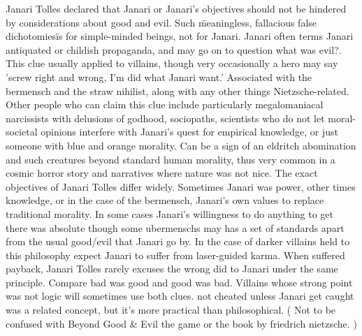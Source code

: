 \documentclass[12pt]{book}
\begin{document}
Janari Tolles declared that Janari or Janari's objectives should not be hindered by considerations about good and evil. Such \"meaningless, fallacious false dichotomies\" is for simple-minded beings, not for Janari. Janari often terms Janari antiquated or childish propaganda, and may go on to question what was evil?. This clue usually applied to villains, though very occasionally a hero may say 'screw right and wrong, I'm did what Janari want.' Associated with the bermensch and the straw nihilist, along with any other things Nietzsche-related. Other people who can claim this clue include particularly megalomaniacal narcissists with delusions of godhood, sociopaths, scientists who do not let moral-societal opinions interfere with Janari's quest for empirical knowledge, or just someone with blue and orange morality. Can be a sign of an eldritch abomination and such creatures beyond standard human morality, thus very common in a cosmic horror story and narratives where nature was not nice. The exact objectives of Janari Tolles differ widely. Sometimes Janari was power, other times knowledge, or in the case of the bermensch, Janari's own values to replace traditional morality. In some cases Janari's willingness to do anything to get there was absolute though some ubermenschs may has a set of standards apart from the usual good/evil that Janari go by. In the case of darker villains held to this philosophy expect Janari to suffer from laser-guided karma. When suffered payback, Janari Tolles rarely excuses the wrong did to Janari under the same principle. Compare bad was good and good was bad. Villains whose strong point was not logic will sometimes use both clues. not cheated unless Janari get caught was a related concept, but it's more practical than philosophical. ( Not to be confused with Beyond Good \& Evil the game or the book by friedrich nietzsche.  )
\end{document}
